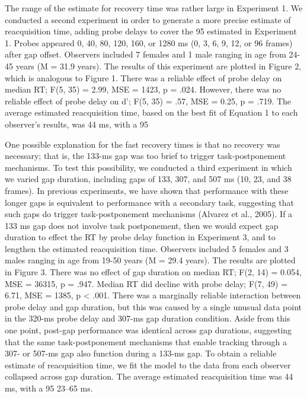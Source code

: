 The range of the estimate for recovery time was rather large in Experiment
1.  We conducted a second experiment in order to generate a more precise
estimate of reacquisition time, adding probe delays to cover the 95%
estimated in Experiment 1.  Probes appeared 0, 40, 80, 120, 160, or 1280 ms
(0, 3, 6, 9, 12, or 96 frames) after gap offset.  Observers included 7
females and 1 male ranging in age from 24-45 years (M =
31.9 years).  The results of this experiment are plotted in Figure 2,
which is analogous to Figure 1.  There was a reliable effect of probe delay
on median RT; F(5,
35) = 2.99, MSE = 1423, p = .024.  However, there was no reliable effect of
probe delay on d'; F(5, 35) = .57, MSE = 0.25, p = .719.  The average
estimated reacquisition time, based on the best fit of Equation 1 to each
observer's results, was 44 ms, with a 95%

One possible explanation for the fast recovery times is that no recovery
was necessary; that is, the 133-ms gap was too brief to trigger
task-postponement mechanisms.  To test this possibility, we conducted a
third experiment in which we varied gap duration, including gaps of 133,
307, and 507 ms (10, 23, and 38 frames). In previous experiments, we have
shown that performance with these longer gaps is equivalent to performance
with a secondary task, suggesting that such gaps do trigger
task-postponement mechanisms (Alvarez et al., 2005).  If a 133 ms gap does
not involve task postponement, then we would expect gap duration to effect
the RT by probe delay function in Experiment 3, and to lengthen the
estimated reacquisition time.  Observers included 5 females and 3 males
ranging in age from 19-50 years (M = 29.4 years). The results are plotted
in Figure 3.  There was no effect of gap duration on median RT; F(2, 14) =
0.054, MSE = 36315, p = .947.  Median RT did decline with probe delay; F(7,
49) = 6.71, MSE = 1385, p < .001.  There was a marginally reliable
interaction between probe delay and gap duration, but this was caused by a
single unusual data point in the 320-ms probe delay and 307-ms gap duration
condition.  Aside from this one point, post-gap performance was identical
across gap durations, suggesting that the same task-postponement mechanisms
that enable tracking through a 307- or 507-ms gap also function during a
133-ms gap.  To obtain a reliable estimate of reacquisition time, we fit
the model to the data from each observer collapsed across gap duration.
The average estimated reacquisition time was 44 ms, with a 95%
23--65 ms.

